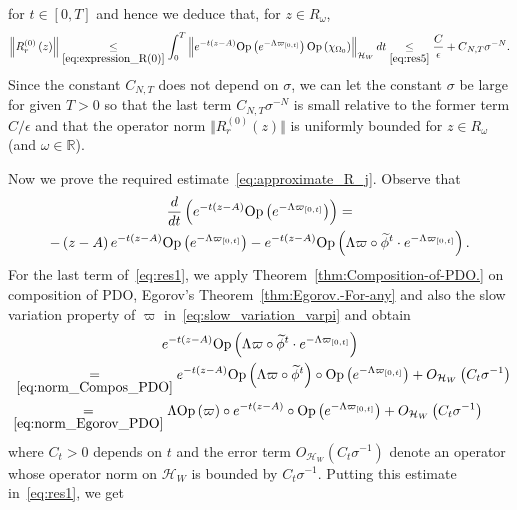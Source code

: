 \documentclass[AHL,Unicode,longabstracts,published]{cedram}
\newcommand{\clH}{\mathcal{H}}
\newcommand{\Opp}{\mathrm{Op}}
\newcommand{\bbR}{\mathbb{R}}
\let\oldtilde\tilde
\renewcommand*{\tilde}[1]{\mathchoice{\widetilde{#1}}{\widetilde{#1}}{\oldtilde{#1}}{\oldtilde{#1}}}
\newcommand{\clH}{\mathcal{H}}
\newcommand{\bbR}{\mathbb{R}}
\begin{document}
for $t\in[0,T]$ and hence we deduce that, for $z\in R_{\omega}$,
\[
\left\Vert R_{r}^{\left(0\right)}\left(z\right)\right\Vert \underset{\eqref{eq:expression_R(0)}}{\leq}\int_{0}^{T}\left\Vert e^{-t\left(z-A\right)}\Opp \left(e^{-\Lambda\varpi_{\left[0,t\right]}}\right)\Opp \left(\chi_{\Omega_{0}}\right)\right\Vert _{\clH _{W}}dt\underset{\eqref{eq:res5}}{\leq}\frac{C}{\epsilon}+C{}_{N,T}\sigma{}^{-N}.
\]
Since the constant $C_{N,T}$ does not depend on $\sigma$, we can let the constant $\sigma$ be large for given $T>0$ so that the last term $C_{N,T}\sigma{}^{-N}$ is small relative to the former term $C/\epsilon$ and that the operator norm $\Vert R_{r}^{(0)}(z)\Vert $ is uniformly bounded for $z\in R_{\omega}$ (and $\omega\in\bbR$).

Now we prove the required estimate~\eqref{eq:approximate_R_j}. Observe that
\begin{multline}\label{eq:res1}
\frac{d}{dt}\left(e^{-t\left(z-A\right)}\Opp \left(e^{-\Lambda\varpi_{\left[0,t\right]}}\right)\right)  =\\
-\left(z-A\right)e^{-t\left(z-A\right)}\Opp \left(e^{-\Lambda\varpi_{\left[0,t\right]}}\right)
-e^{-t\left(z-A\right)}\Opp \left(\Lambda\varpi\circ\tilde{\phi}^{t}\cdot e^{-\Lambda\varpi_{\left[0,t\right]}}\right).
\end{multline}
For the last term of~\eqref{eq:res1}, we apply Theorem~\ref{thm:Composition-of-PDO.} on composition of PDO, Egorov's Theorem~\ref{thm:Egorov.-For-any} and also the slow variation property of $\varpi$ in~\eqref{eq:slow_variation_varpi} and obtain
\begin{multline*}
e^{-t\left(z-A\right)} \Opp \left(\Lambda\varpi\circ\tilde{\phi}^{t}\cdot e^{-\Lambda\varpi_{\left[0,t\right]}}\right)\\
\begin{aligned}
&\:\underset{\eqref{eq:norm_Compos_PDO}}{=}  e^{-t\left(z-A\right)}\Opp \left(\Lambda\varpi\circ\tilde{\phi}^{t}\right)\circ\Opp \left(e^{-\Lambda\varpi_{\left[0,t\right]}}\right)+O_{\clH _{W}}\left(C_{t}\sigma^{-1}\right)\\
&\underset{\eqref{eq:norm_Egorov_PDO}}{=}  \Lambda\Opp \left(\varpi\right)\circ e^{-t\left(z-A\right)}\circ\Opp \left(e^{-\Lambda\varpi_{\left[0,t\right]}}\right)+O_{\clH _{W}}\left(C_{t}\sigma^{-1}\right)
\end{aligned}
\end{multline*}
where $C_{t}>0$ depends on $t$ and the error term $O_{\clH _{W}}(C_{t}\sigma^{-1})$ denote an operator whose operator norm on $\clH _{W}$ is bounded by $C_{t}\sigma^{-1}$. Putting this estimate in~\eqref{eq:res1}, we get
\end{document}
